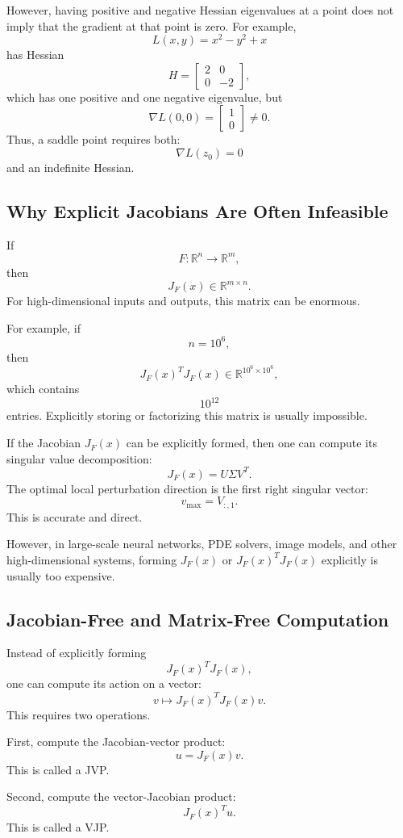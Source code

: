 \documentclass{article}
\begin{document}
However, having positive and negative Hessian eigenvalues at a point does not imply that the gradient at that point is zero. For example,
\[
L(x,y)=x^2-y^2+x
\]
has Hessian
\[
H=
\begin{bmatrix}
2 & 0\\
0 & -2
\end{bmatrix},
\]
which has one positive and one negative eigenvalue, but
\[
\nabla L(0,0)=
\begin{bmatrix}
1\\
0
\end{bmatrix}
\neq 0.
\]
Thus, a saddle point requires both:
\[
\nabla L(z_0)=0
\]
and an indefinite Hessian.

\subsection{Why Explicit Jacobians Are Often Infeasible}

If
\[
F:\mathbb{R}^n\to \mathbb{R}^m,
\]
then
\[
J_F(x)\in \mathbb{R}^{m\times n}.
\]
For high-dimensional inputs and outputs, this matrix can be enormous.

For example, if
\[
n=10^6,
\]
then
\[
J_F(x)^TJ_F(x)\in \mathbb{R}^{10^6\times 10^6},
\]
which contains
\[
10^{12}
\]
entries. Explicitly storing or factorizing this matrix is usually impossible.

If the Jacobian \(J_F(x)\) can be explicitly formed, then one can compute its singular value decomposition:
\[
J_F(x)=U\Sigma V^T.
\]
The optimal local perturbation direction is the first right singular vector:
\[
v_{\max}=V_{:,1}.
\]
This is accurate and direct.

However, in large-scale neural networks, PDE solvers, image models, and other high-dimensional systems, forming \(J_F(x)\) or \(J_F(x)^TJ_F(x)\) explicitly is usually too expensive.

\subsection{Jacobian-Free and Matrix-Free Computation}

Instead of explicitly forming
\[
J_F(x)^TJ_F(x),
\]
one can compute its action on a vector:
\[
v\mapsto J_F(x)^TJ_F(x)v.
\]
This requires two operations.

First, compute the Jacobian-vector product:
\[
u=J_F(x)v.
\]
This is called a JVP.

Second, compute the vector-Jacobian product:
\[
J_F(x)^Tu.
\]
This is called a VJP.
\end{document}
